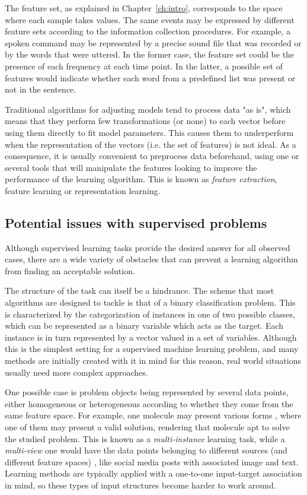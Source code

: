 The feature set, as explained in Chapter~\ref{ch:intro}, corresponds to the space where each sample takes values. The same events may be expressed by different feature sets according to the information collection procedures. For example, a spoken command may be represented by a precise sound file that was recorded or by the words that were uttered. In the former case, the feature set could be the presence of each frequency at each time point. In the latter, a possible set of features would indicate whether each word from a predefined list was present or not in the sentence.

Traditional algorithms for adjusting models tend to process data "as is", which means that they perform few transformations (or none) to each vector before using them directly to fit model parameters. This causes them to underperform when the representation of the vectors (i.e. the set of features) is not ideal. As a consequence, it is usually convenient to preprocess data beforehand, using one or several tools that will manipulate the features looking to improve the performance of the learning algorithm. This is known as \textit{feature extraction}, feature learning or representation learning. 

\subsection{Potential issues with supervised problems}

Although supervised learning tasks provide the desired answer for all observed cases, there are a wide variety of obstacles that can prevent a learning algorithm from finding an acceptable solution.

The structure of the task can itself be a hindrance. The scheme that most algorithms are designed to tackle is that of a binary classification problem. This is characterized by the categorization of instances in one of two possible classes, which can be represented as a binary variable which acts as the target. Each instance is in turn represented by a vector valued in a set of variables. Although this is the simplest setting for a supervised machine learning problem, and many methods are initially created with it in mind for this reason, real world situations usually need more complex approaches.

One possible case is problem objects being represented by several data points, either homogeneous or heterogeneous according to whether they come from the same feature space. For example, one molecule may present various forms , where one of them may present a valid solution, rendering that molecule apt to solve the studied problem. This is known as a \textit{multi-instance} learning task, while a \textit{multi-view} one would have the data points belonging to different sources (and different feature spaces) , like social media posts with associated image and text. Learning methods are typically applied with a one-to-one input-target association in mind, so these types of input structures become harder to work around.


